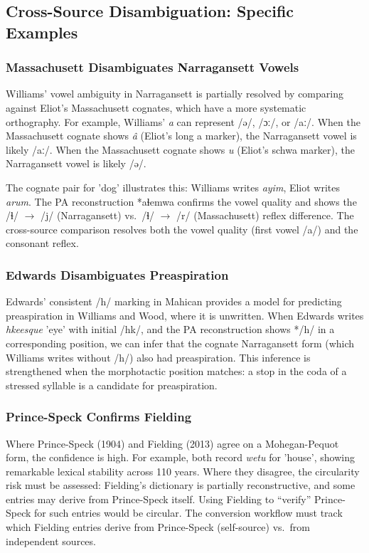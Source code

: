 \subsection{Cross-Source Disambiguation: Specific Examples}

\subsubsection{Massachusett Disambiguates Narragansett Vowels}

Williams' vowel ambiguity in Narragansett is partially resolved by comparing
against Eliot's Massachusett cognates, which have a more systematic
orthography. For example, Williams' \textit{a} can represent /ə/, /ɔː/, or
/aː/. When the Massachusett cognate shows \textit{â} (Eliot's long a marker),
the Narragansett vowel is likely /aː/. When the Massachusett cognate shows
\textit{u} (Eliot's schwa marker), the Narragansett vowel is likely /ə/.

The cognate pair for 'dog' illustrates this: Williams writes \textit{ayim},
Eliot writes \textit{arum}. The PA reconstruction *aɬemwa confirms the
vowel quality and shows the /ɬ/ $\rightarrow$ /j/ (Narragansett) vs.\ /ɬ/
$\rightarrow$ /r/ (Massachusett) reflex difference. The cross-source
comparison resolves both the vowel quality (first vowel /a/) and the
consonant reflex.

\subsubsection{Edwards Disambiguates Preaspiration}

Edwards' consistent /h/ marking in Mahican provides a model for predicting
preaspiration in Williams and Wood, where it is unwritten. When Edwards
writes \textit{hkeesque} 'eye' with initial /hk/, and the PA reconstruction
shows */h/ in a corresponding position, we can infer that the cognate
Narragansett form (which Williams writes without /h/) also had preaspiration.
This inference is strengthened when the morphotactic position matches: a stop
in the coda of a stressed syllable is a candidate for preaspiration.

\subsubsection{Prince-Speck Confirms Fielding}

Where Prince-Speck (1904) and Fielding (2013) agree on a Mohegan-Pequot
form, the confidence is high. For example, both record \textit{wetu} for
'house', showing remarkable lexical stability across 110 years. Where they
disagree, the circularity risk must be assessed: Fielding's dictionary is
partially reconstructive, and some entries may derive from Prince-Speck
itself. Using Fielding to ``verify'' Prince-Speck for such entries would be
circular. The conversion workflow must track which Fielding entries derive
from Prince-Speck (self-source) vs.\ from independent sources.

